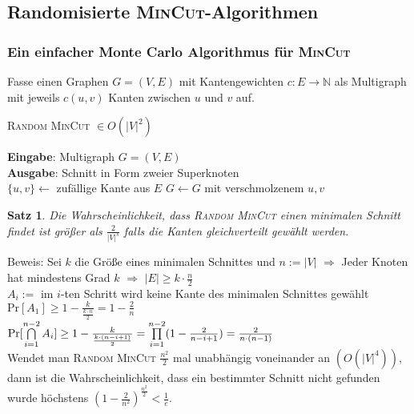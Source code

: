 \documentclass[a4paper,10pt]{scrartcl}
\newcommand{\tbf}{\textbf}
\newcommand{\tsc}{\textsc}
\newcommand{\Ra}{\Rightarrow}
\newcommand{\agn}{\leftarrow}
\newcommand{\Gr}{$G = (V,E)$ }
\newcommand{\Gwfktn}{$c: E \rightarrow \mathbb{N}$ }
\renewcommand{\Pr}{\text{Pr}}
\newcommand{\Eingabe}[1]{\STATE \tbf{Eingabe}: #1 \\}
\newcommand{\Ausgabe}[1]{\STATE \tbf{Ausgabe}: #1 \\}
\newtheorem{satz}{Satz}
\begin{document}
\subsection{Randomisierte \tsc{MinCut}-Algorithmen}
\subsubsection{Ein einfacher Monte Carlo Algorithmus für \tsc{MinCut}}
Fasse einen Graphen \Gr mit Kantengewichten \Gwfktn als Multigraph mit jeweils $c({u,v})$ Kanten zwischen $u$ und $v$ auf. \\

\begin{algorithm}
\caption{\tsc{Random MinCut} $\in O(|V|^2)$}
\begin{algorithmic}
\Eingabe{Multigraph \Gr}
\Ausgabe{Schnitt in Form zweier Superknoten}
	\STATE $\{u,v\} \agn $ zufällige Kante aus $E$
	\STATE $G \agn G$ mit verschmolzenem $u,v$ 
\ENDWHILE
\end{algorithmic}
\end{algorithm}

\begin{satz}
 Die Wahrscheinlichkeit, dass \tsc{Random MinCut} einen minimalen Schnitt findet ist größer als $\frac{2}{|V|^s}$ falls die Kanten gleichverteilt gewählt werden.
\end{satz}

Beweis: Sei $k$ die Größe eines minimalen Schnittes und $n := |V|$ $\Ra$ Jeder Knoten hat mindestens Grad $k$ $\Ra$ $|E| \geq k \cdot \frac{n}{2}$ \\
$A_i :=$ im $i$-ten Schritt wird keine Kante des minimalen Schnittes gewählt \\
$\Pr[A_1] \geq 1 - \frac{k}{\frac{k \cdot n}{2}} = 1 - \frac{2}{n}$ \\
$\Pr[\bigcap_{i=1}^{n-2} \limits A_i] \geq  1 - \frac{k}{\frac{k \cdot (n - i + 1)}{2}} = \prod_{i=1}^{n-2} \limits  (1 - \frac{2}{n - i + 1}) = \frac{2}{n \cdot (n - 1)}$ \\

Wendet man \tsc{Random MinCut} $\frac{n^2}{2}$ mal unabhängig voneinander an $(O(|V|^4))$, dann ist die Wahrscheinlichkeit, dass ein bestimmter Schnitt nicht gefunden wurde höchstens $(1 - \frac{2}{n^2})^\frac{n^2}{2} < \frac{1}{e}$. \\
\end{document}
